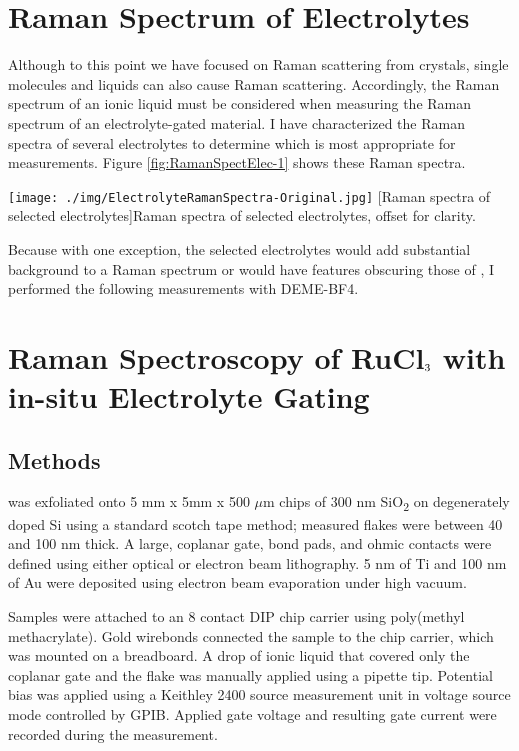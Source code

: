 \section{Raman Spectrum of Electrolytes}
Although to this point we have focused on Raman scattering from crystals, single molecules and liquids can also cause Raman scattering. Accordingly, the Raman spectrum of an ionic liquid must be considered when measuring the Raman spectrum of an electrolyte-gated material. I have characterized the Raman spectra of several electrolytes to determine which is most appropriate for measurements. Figure \ref{fig:RamanSpectElec-1} shows these Raman spectra.

\begin{centering}
\texttt{[image: ./img/ElectrolyteRamanSpectra-Original.jpg]}
  \captionsetup{width=0.75\textwidth}
  [Raman spectra of selected electrolytes]{Raman spectra of selected electrolytes, offset for clarity.}
  \label{fig:RamanSpectElec-1}
\end{centering}

Because with one exception, the selected electrolytes would add substantial background to a Raman spectrum or would have features obscuring those of \rucl, I performed the following measurements with DEME-BF4.

\section{Raman Spectroscopy of \texorpdfstring{RuCl$\textsubscript{3}$}{RuCl3} with in-situ Electrolyte Gating}

\subsection{Methods}
\rucl was exfoliated onto 5 mm x 5mm x 500 $\mu$m chips of 300 nm SiO\textsubscript{2} on degenerately doped Si using a standard scotch tape method; measured \rucl flakes were between 40 and 100 nm thick. A large, coplanar gate, bond pads, and ohmic contacts were defined using either optical or electron beam lithography. 5 nm of Ti and 100 nm of Au were deposited using electron beam evaporation under high vacuum.

Samples were attached to an 8 contact DIP chip carrier using poly(methyl methacrylate). Gold wirebonds connected the sample to the chip carrier, which was mounted on a breadboard. A drop of ionic liquid that covered only the coplanar gate and the \rucl flake was manually applied using a pipette tip. Potential bias was applied using a Keithley 2400 source measurement unit in voltage source mode controlled by GPIB. Applied gate voltage and resulting gate current were recorded during the measurement.

